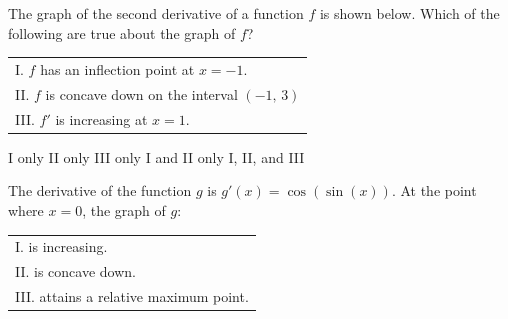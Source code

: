 \begin{questions}
    \question The graph of the second derivative of a function $f$ is shown below. Which of the following are true about the graph of $f$? 
    \begin{center}
    \end{center}
    \begin{center}
        \begin{tabular}{l}
            I. $f$ has an inflection point at $x = -1$. \\[11pt]
            II. $f$ is concave down on the interval $(-1, \, 3)$ \\[11pt]
            III. $f'$ is increasing at $x = 1$.
        \end{tabular}
    \end{center} \vspace{11pt}

    \begin{oneparchoices}
        \choice I only
        \choice II only
        \choice III only
        \choice I and II only
        \choice I, II, and III
    \end{oneparchoices} \par \horizontalline 

    \newpage

    \question The derivative of the function $g$ is $g'(x) = \cos(\sin (x))$. At the point where $x = 0$, the graph of $g$: \par 
    \begin{center}
        \begin{tabular}{l}
            I. is increasing. \\[11pt]
            II. is concave down. \\[11pt]
            III. attains a relative maximum point. 
        \end{tabular}
    \end{center} \vspace{11pt}


\end{questions}
